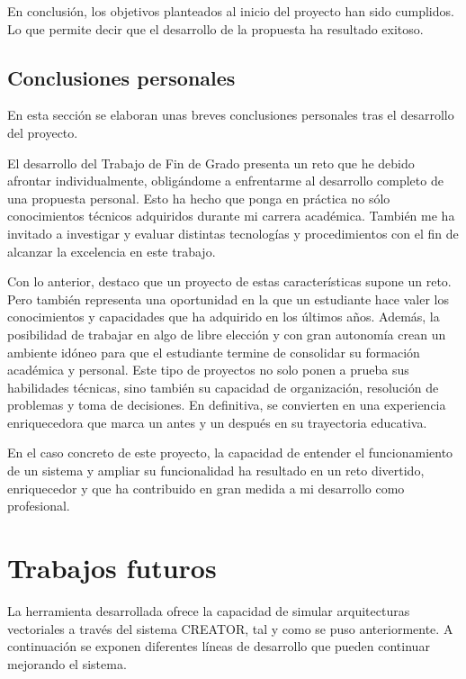 En conclusión, los objetivos planteados al inicio del proyecto han sido cumplidos. Lo que permite decir que el desarrollo de la propuesta ha resultado exitoso.

\subsection{Conclusiones personales}

En esta sección se elaboran unas breves conclusiones personales tras el desarrollo del proyecto.

El desarrollo del Trabajo de Fin de Grado presenta un reto que he debido afrontar individualmente, obligándome a enfrentarme al desarrollo completo de una propuesta personal. Esto ha hecho que ponga en práctica no sólo conocimientos técnicos adquiridos durante mi carrera académica. También me ha invitado a investigar y evaluar distintas tecnologías y procedimientos con el fin de alcanzar la excelencia en este trabajo.

Con lo anterior, destaco que un proyecto de estas características supone un reto. Pero también representa una oportunidad en la que un estudiante hace valer los conocimientos y capacidades que ha adquirido en los últimos años. Además, la posibilidad de trabajar en algo de libre elección y con gran autonomía crean un ambiente idóneo para que el estudiante termine de consolidar su formación académica y personal. Este tipo de proyectos no solo ponen a prueba sus habilidades técnicas, sino también su capacidad de organización, resolución de problemas y toma de decisiones. En definitiva, se convierten en una experiencia enriquecedora que marca un antes y un después en su trayectoria educativa.

En el caso concreto de este proyecto, la capacidad de entender el funcionamiento de un sistema y ampliar su funcionalidad ha resultado en un reto divertido, enriquecedor y que ha contribuido en gran medida a mi desarrollo como profesional.


\section{Trabajos futuros}\label{sec:future-work}

La herramienta desarrollada ofrece la capacidad de simular arquitecturas vectoriales a través del sistema CREATOR, tal y como se puso anteriormente. A continuación se exponen diferentes líneas de desarrollo que pueden continuar mejorando el sistema.

